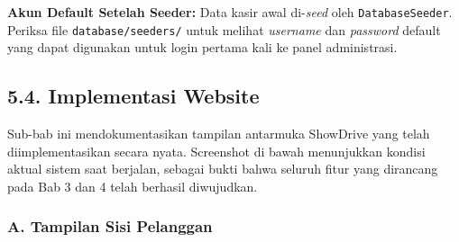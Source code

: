 \documentclass[11pt, a5paper]{article}
\begin{document}
\begin{infobox}
\textbf{Akun Default Setelah Seeder:} Data kasir awal di-\textit{seed} oleh
\texttt{DatabaseSeeder}. Periksa file \texttt{database/seeders/} untuk melihat
\textit{username} dan \textit{password} default yang dapat digunakan untuk
login pertama kali ke panel administrasi.
\end{infobox}

\subsection*{5.4. Implementasi Website}

Sub-bab ini mendokumentasikan tampilan antarmuka ShowDrive yang telah
diimplementasikan secara nyata. Screenshot di bawah menunjukkan kondisi aktual
sistem saat berjalan, sebagai bukti bahwa seluruh fitur yang dirancang pada
Bab 3 dan 4 telah berhasil diwujudkan.

\subsubsection*{A. Tampilan Sisi Pelanggan}
\end{document}
